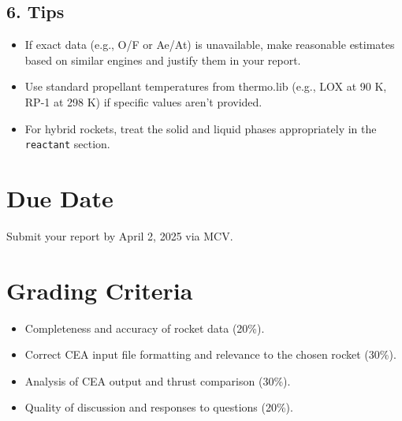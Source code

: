 \documentclass[12pt]{article}
\begin{document}
\subsection{6. Tips}
\begin{itemize}
    \item If exact data (e.g., O/F or Ae/At) is unavailable, make reasonable estimates based on similar engines and justify them in your report.
    \item Use standard propellant temperatures from thermo.lib (e.g., LOX at 90 K, RP-1 at 298 K) if specific values aren't provided.
    \item For hybrid rockets, treat the solid and liquid phases appropriately in the \texttt{reactant} section.
\end{itemize}

\section{Due Date}
Submit your report by April 2, 2025 via MCV.

\section{Grading Criteria}
\begin{itemize}
    \item Completeness and accuracy of rocket data (20\%).
    \item Correct CEA input file formatting and relevance to the chosen rocket (30\%).
    \item Analysis of CEA output and thrust comparison (30\%).
    \item Quality of discussion and responses to questions (20\%).
\end{itemize}
\end{document}
